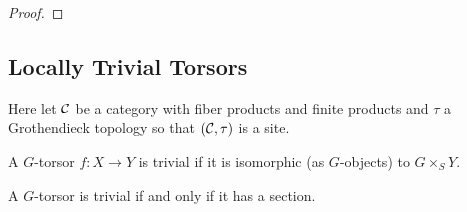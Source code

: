\documentclass[12pt]{article}
\begin{document}
\begin{proof}

\end{proof}

\subsection{Locally Trivial Torsors}

Here let $\mathcal{C}$ be a category with fiber products and finite products and $\tau$ a Grothendieck topology so that $(\mathcal{C}, \tau)$ is a site.

\begin{defn}
A $G$-torsor $f : X \to Y$ is trivial if it is isomorphic (as $G$-objects) to $G \times_S Y$.
\end{defn}

\begin{lemma}
A $G$-torsor is trivial if and only if it has a section.
\end{lemma}
\end{document}
